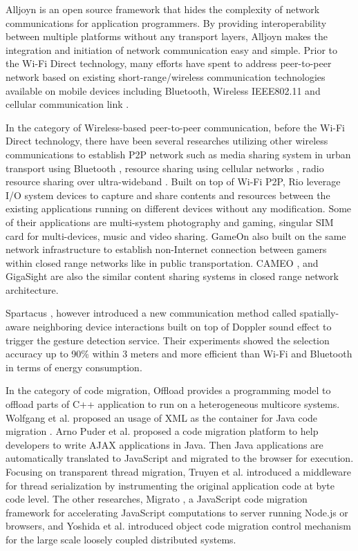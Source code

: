\documentclass{sig-alternate}
\begin{document}
Alljoyn \cite{alljoyn} is an open source framework that hides the complexity of network communications for application programmers. By providing interoperability between multiple platforms without any transport layers, Alljoyn makes the integration and initiation of network communication easy and simple. Prior to the Wi-Fi Direct technology, many efforts have spent to address peer-to-peer network based on existing short-range/wireless communication technologies available on mobile devices including Bluetooth, Wireless IEEE802.11 and cellular communication link \cite{m_p2p_tutor,bella+:context_aware_mid}. 

In the category of Wireless-based peer-to-peer communication, before the Wi-Fi Direct technology, there have been several researches utilizing other wireless communications to establish P2P network such as media sharing system in urban transport using Bluetooth \cite{media_share}, resource sharing using cellular networks \cite{chia+:res_share}, radio resource sharing over ultra-wideband \cite{cuomo+:radio_share}. Built on top of Wi-Fi P2P, Rio \cite{rio} leverage I/O system devices to capture and share contents and resources between the existing applications running on different devices without any modification. Some of their applications are multi-system photography and gaming, singular SIM card for multi-devices, music and video sharing. GameOn \cite{gameon} also built on the same network infrastructure to establish non-Internet connection between gamers within closed range networks like in public transportation. CAMEO \cite{cameo}, and GigaSight \cite{crowd-sourcing} are also the similar content sharing systems in closed range network architecture.

Spartacus \cite{spartacus}, however introduced a new communication method called spatially-aware neighboring device interactions built on top of Doppler sound effect to trigger the gesture detection service. Their experiments showed the selection accuracy up to 90\% within 3 meters and more efficient than Wi-Fi and Bluetooth in terms of energy consumption.

In the category of code migration, Offload \cite{Cooper:2010:OAC:2174824.2174856} provides a programming model to offload parts of C++ application to run on a heterogeneous multicore systems. Wolfgang et al. proposed an usage of XML as the container for Java code migration \cite{Emmerich:2000:IIC:337180.337227}. Arno Puder et al. \cite{Puder:2006:CMF:2122992.2123003} proposed a code migration platform to help developers to write AJAX applications in Java. Then Java applications are automatically translated to JavaScript and migrated to the browser for execution. Focusing on transparent thread migration, Truyen et al. \cite{Truyen:2000:PST:647629.732581} introduced a middleware for thread serialization by instrumenting the original application code at byte code level. The other researches, Migrato \cite{Tseng:2015:MJM:2695664.2695987}, a JavaScript code migration framework for accelerating JavaScript computations to server running Node.js or browsers, and Yoshida et al. \cite{Yoshida:2007:CMC:1378063.1378069} introduced object code migration control mechanism for the large scale loosely coupled distributed systems. 
\end{document}
